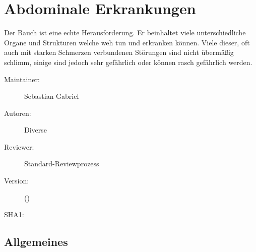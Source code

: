 \def\ChapterCode{ABD}
\chapter
[\CO{[ABD]} Abdominale Erkrankungen]
{\CC{[ABD]} Abdominale Erkrankungen}
\ChapterIntro
{%
Der Bauch ist eine echte Herausforderung. Er beinhaltet
viele unterschiedliche Organe und Strukturen welche weh tun
und erkranken können. Viele dieser, oft auch mit starken
Schmerzen verbundenen Störungen sind nicht übermäßig
schlimm, einige sind jedoch sehr gefährlich oder können
rasch gefährlich werden.


}
{%
\begin{description}
  \item[Maintainer:] Sebastian Gabriel
  \item[Autoren:] Diverse
  \item[Reviewer:] Standard-Reviewprozess
  \item[Version:] {\DocVersion} ({\DocVersionInfo})
  \item[SHA1:] {\DocGitCommit}
\end{description}

{\TxTeilkapitelAASS}
}


\clearpage

\section{Allgemeines}

